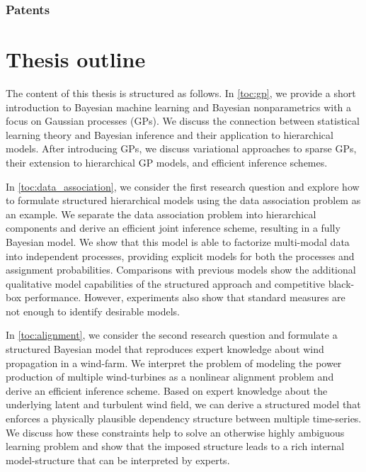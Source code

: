 \subsubsection{Patents}


\section{Thesis outline}
The content of this thesis is structured as follows.
In \cref{toc:gp}, we provide a short introduction to Bayesian machine learning and Bayesian nonparametrics with a focus on Gaussian processes (GPs).
We discuss the connection between statistical learning theory and Bayesian inference and their application to hierarchical models.
After introducing GPs, we discuss variational approaches to sparse GPs, their extension to hierarchical GP models, and efficient inference schemes.

In \cref{toc:data_association}, we consider the first research question and explore how to formulate structured hierarchical models using the data association problem as an example.
We separate the data association problem into hierarchical components and derive an efficient joint inference scheme, resulting in a fully Bayesian model.
We show that this model is able to factorize multi-modal data into independent processes, providing explicit models for both the processes and assignment probabilities.
Comparisons with previous models show the additional qualitative model capabilities of the structured approach and competitive black-box performance.
However, experiments also show that standard measures are not enough to identify desirable models.

In \cref{toc:alignment}, we consider the second research question and formulate a structured Bayesian model that reproduces expert knowledge about wind propagation in a wind-farm.
We interpret the problem of modeling the power production of multiple wind-turbines as a nonlinear alignment problem and derive an efficient inference scheme.
Based on expert knowledge about the underlying latent and turbulent wind field, we can derive a structured model that enforces a physically plausible dependency structure between multiple time-series.
We discuss how these constraints help to solve an otherwise highly ambiguous learning problem and show that the imposed structure leads to a rich internal model-structure that can be interpreted by experts.

